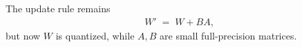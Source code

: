 The update rule remains
\begin{align*}
	W' \;=\; W + BA,
\end{align*}
but now $W$ is quantized, while $A, B$ are small full-precision matrices.



